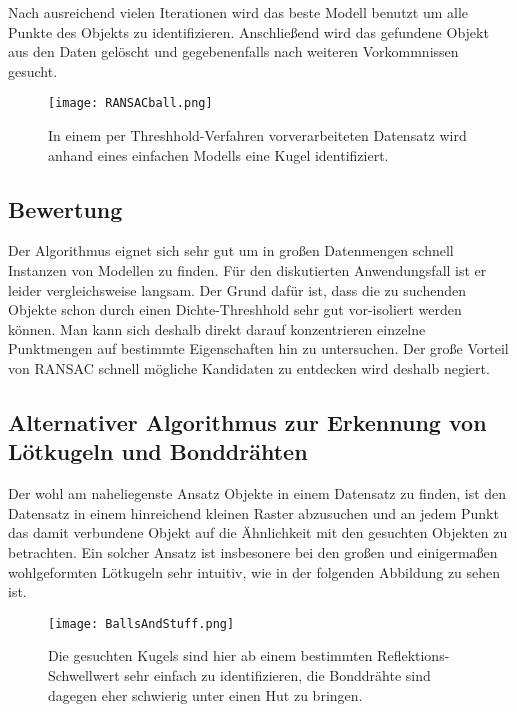 Nach ausreichend vielen Iterationen wird das beste Modell benutzt um alle Punkte des Objekts zu identifizieren. Anschließend wird das gefundene Objekt aus den Daten gelöscht und gegebenenfalls nach weiteren Vorkommnissen gesucht.

\begin{figure}[H]
  \begin{center}
    \texttt{[image: RANSACball.png]}
    \caption{In einem per Threshhold-Verfahren vorverarbeiteten Datensatz wird anhand eines einfachen Modells eine Kugel identifiziert.}
    \label{fig:ransac2}
  \end{center}
\end{figure}

\subsection{Bewertung}
Der Algorithmus eignet sich sehr gut um in großen Datenmengen schnell Instanzen von Modellen zu finden. Für den diskutierten Anwendungsfall ist er leider vergleichsweise langsam. Der Grund dafür ist, dass die zu suchenden Objekte schon durch einen Dichte-Threshhold sehr gut vor-isoliert werden können. Man kann sich deshalb direkt darauf konzentrieren einzelne Punktmengen auf bestimmte Eigenschaften hin zu untersuchen. Der große Vorteil von RANSAC schnell mögliche Kandidaten zu entdecken wird deshalb negiert.

\subsection{Alternativer Algorithmus zur Erkennung von Lötkugeln und Bonddrähten}
Der wohl am naheliegenste Ansatz Objekte in einem Datensatz zu finden, ist den Datensatz in einem hinreichend kleinen Raster abzusuchen und an jedem Punkt das damit verbundene Objekt auf die Ähnlichkeit mit den gesuchten Objekten zu betrachten.
Ein solcher Ansatz ist insbesonere bei den großen und einigermaßen wohlgeformten Lötkugeln sehr intuitiv, wie in der folgenden Abbildung zu sehen ist.


\begin{figure}[H]
  \begin{center}
    \texttt{[image: BallsAndStuff.png]}
    \caption{Die gesuchten Kugels sind hier ab einem bestimmten Reflektions-Schwellwert sehr einfach zu identifizieren, die Bonddrähte sind dagegen eher schwierig unter einen Hut zu bringen.}
    \label{fig:BallsAndStuff}
  \end{center}
\end{figure}

